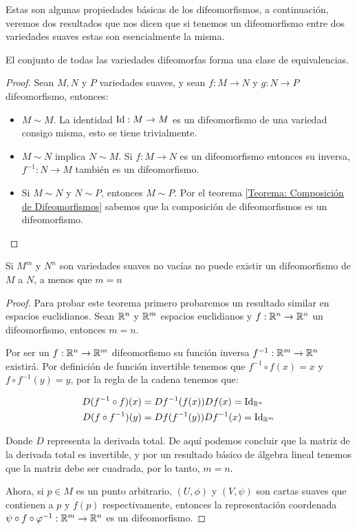 Estas son algunas propiedades básicas de los difeomorfismos, a continuación, veremos dos resultados que nos dicen que si tenemos un difeomorfismo entre dos variedades suaves estas son esencialmente la misma.

\begin{theorem}
  El conjunto de todas las variedades difeomorfas forma una clase de equivalencias. 
\end{theorem}

\begin{proof} Sean $M,N$ y $P$ variedades suaves, y sean $f: M \to N$ y $g: N \to P$ difeomorfismo, entonces:
  \begin{itemize}
    \item $M \sim M$. La identidad $\mathrm{Id}: M \to M$ es un difeomorfismo de una variedad consigo misma, esto se tiene trivialmente.
    \item $M \sim N$ implica $N \sim M$. Si $f: M \to N$ es un difeomorfismo entonces su inversa, $f^{-1}: N \to M$ también es un difeomorfismo.
    \item Si $M \sim N$ y $N \sim P$, entonces $M \sim P$. Por el teorema \ref{Teorema: Composición de Difeomorfismos} sabemos que la composición de difeomorfismos es un difeomorfismo.
  \end{itemize}
\end{proof}

\begin{theorem}
  Si $M^m$ y $N^n$ son variedades suaves no vacías no puede existir un difeomorfismo de $M$ a $N$, a menos que $m=n$
\end{theorem}

\begin{proof}
  Para probar este teorema primero probaremos un resultado similar en espacios euclidianos. Sean $\mathbb{R}^n$ y $\mathbb{R}^m$ espacios euclidianos y $f: \mathbb{R}^n \to \mathbb{R}^n$ un difeomorfismo, entonces $m = n$.

  Por ser un $f: \mathbb{R}^n \to \mathbb{R}^m$ difeomorfismo su función inversa  $f^{-1}: \mathbb{R}^m \to \mathbb{R}^n$ existirá. Por definición de función invertible tenemos que $f^{-1} \circ f (x) = x$ y $f \circ f^{-1}(y) = y$, por la regla de la cadena tenemos que:

  \begin{align*}
    D(f^{-1} \circ f)(x) &= Df^{-1}(f(x))Df(x) = \mathrm{Id}_{\mathbb{R}^n}\\
    D(f \circ f^{-1})(y) &= Df(f^{-1}(y))Df^{-1}(x) = \mathrm{Id}_{\mathbb{R}^m}
  \end{align*}

  Donde $D$ representa la derivada total. De aquí podemos concluir que la matriz de la derivada total es invertible, y por un resultado básico de álgebra lineal tenemos que la matriz debe ser cuadrada, por lo tanto, $m = n$.

  Ahora, si $p \in M$ es un punto arbitrario, $(U,\phi)$ y $(V,\psi)$ son cartas suaves que contienen a $p$ y $f(p)$ respectivamente, entonces la representación coordenada $\psi \circ f \circ \varphi^{-1}: \mathbb{R}^m \to \mathbb{R}^n$ es un difeomorfismo. 
\end{proof}
